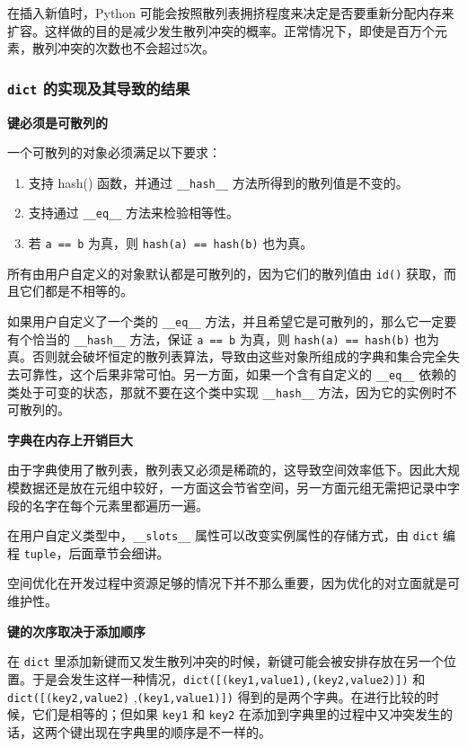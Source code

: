 在插入新值时，Python 可能会按照散列表拥挤程度来决定是否要重新分配内存来扩容。这样做的目的是减少发生散列冲突的概率。正常情况下，即使是百万个元素，散列冲突的次数也不会超过5次。

\subsubsection{\texttt{dict} 的实现及其导致的结果}

\noindent\textbf{键必须是可散列的}

一个可散列的对象必须满足以下要求：
\begin{enumerate}
    \item 支持 hash() 函数，并通过 \texttt{\_\_hash\_\_} 方法所得到的散列值是不变的。
    \item 支持通过 \texttt{\_\_eq\_\_} 方法来检验相等性。
    \item 若 \texttt{a == b} 为真，则 \texttt{hash(a) == hash(b)} 也为真。
\end{enumerate}

所有由用户自定义的对象默认都是可散列的，因为它们的散列值由 \texttt{id()} 获取，而且它们都是不相等的。

如果用户自定义了一个类的 \texttt{\_\_eq\_\_} 方法，并且希望它是可散列的，那么它一定要有个恰当的 \texttt{\_\_hash\_\_} 方法，保证 \texttt{a == b} 为真，则 \texttt{hash(a) == hash(b)} 也为真。否则就会破坏恒定的散列表算法，导致由这些对象所组成的字典和集合完全失去可靠性，这个后果非常可怕。另一方面，如果一个含有自定义的 \texttt{\_\_eq\_\_} 依赖的类处于可变的状态，那就不要在这个类中实现 \texttt{\_\_hash\_\_} 方法，因为它的实例时不可散列的。

\noindent\textbf{字典在内存上开销巨大}

由于字典使用了散列表，散列表又必须是稀疏的，这导致空间效率低下。因此大规模数据还是放在元组中较好，一方面这会节省空间，另一方面元组无需把记录中字段的名字在每个元素里都遍历一遍。

在用户自定义类型中，\texttt{\_\_slots\_\_} 属性可以改变实例属性的存储方式，由 \texttt{dict} 编程 \texttt{tuple}，后面章节会细讲。

空间优化在开发过程中资源足够的情况下并不那么重要，因为优化的对立面就是可维护性。

\noindent\textbf{键的次序取决于添加顺序}

在 \texttt{dict} 里添加新键而又发生散列冲突的时候，新键可能会被安排存放在另一个位置。于是会发生这样一种情况，\texttt{dict([(key1,value1),(key2,value2)])} 和 \texttt{dict([(key2,value2)}
,\texttt{(key1,value1)])} 得到的是两个字典。在进行比较的时候，它们是相等的；但如果 \texttt{key1} 和 \texttt{key2} 在添加到字典里的过程中又冲突发生的话，这两个键出现在字典里的顺序是不一样的。

